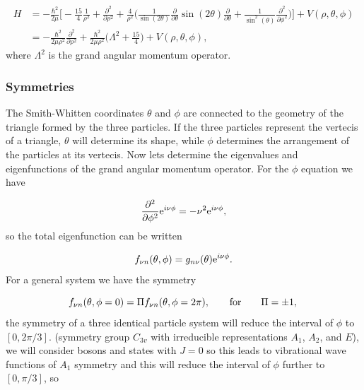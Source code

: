 \documentclass{article}
\newcommand{\me}{\mathrm{e}}
\numberwithin{equation}{section}
\numberwithin{figure}{section}
\begin{document}
\begin{align}
H &= -\frac{\hbar^{2}}{2 \mu} \Bigg[ -\frac{15}{4} \frac{1}{\rho^{2}} + \frac{\partial^{2}}{\partial \rho^{2}}+ \frac{4}{\rho^{2}}\Big( \frac{1}{\sin(2\theta)} \frac{\partial}{\partial \theta} \sin(2\theta) \frac{\partial}{\partial \theta} + \frac{1}{\sin^{2}(\theta)} \frac{\partial^{2}}{\partial \phi^{2}} \Big) \Bigg] + V(\rho, \theta, \phi)\\
&= -\frac{\hbar^{2}}{2 \mu \rho^{2} }\frac{\partial^2}{\partial \rho^2} + \frac{\hbar^{2}}{2 \mu \rho^{2} } \Bigg(\Lambda^2 + \frac{15}{4}\Bigg)+ V(\rho, \theta, \phi),
\end{align}
where $\Lambda^2$ is the grand angular momentum operator.

\subsubsection{Symmetries}
The Smith-Whitten coordinates $\theta$ and $\phi$ are connected to the geometry of the triangle formed by the three particles. If the three particles represent the vertecis of a triangle, $\theta$ will determine its shape, while $\phi$ determines the arrangement of the particles at its vertecis. Now lets determine the eigenvalues and eigenfunctions of the grand angular momentum operator. For the $\phi$ equation we have

\begin{equation}
\frac{\partial^{2}}{\partial \phi^{2}} \me^{ i \nu \phi} = -\nu^{2} \me^{ i \nu \phi}\\,
\end{equation}
so the total eigenfunction can be written

\begin{equation}
f_{\nu n}(\theta,\phi) = g_{n \nu}(\theta) \me^{ i \nu \phi}\\. 
\end{equation}
For a general system we have the symmetry 

\begin{equation}
f_{\nu n}(\theta,\phi = 0) = \Pi f_{\nu n}(\theta,\phi = 2\pi), \qquad \text{for} \qquad \Pi = \pm 1,\\
\end{equation}
the symmetry of a three identical particle system will reduce the interval of $\phi$ to $[0,2\pi/3]$. (symmetry group $C_{3v}$ with irreducible representations $A_{1}$, $A_{2}$, and $E$), we will consider bosons and states with $J=0$ so this leads to vibrational wave functions of $A_{1}$ symmetry and this will reduce the interval of $\phi$ further to $[0,\pi/3]$, so
\end{document}
